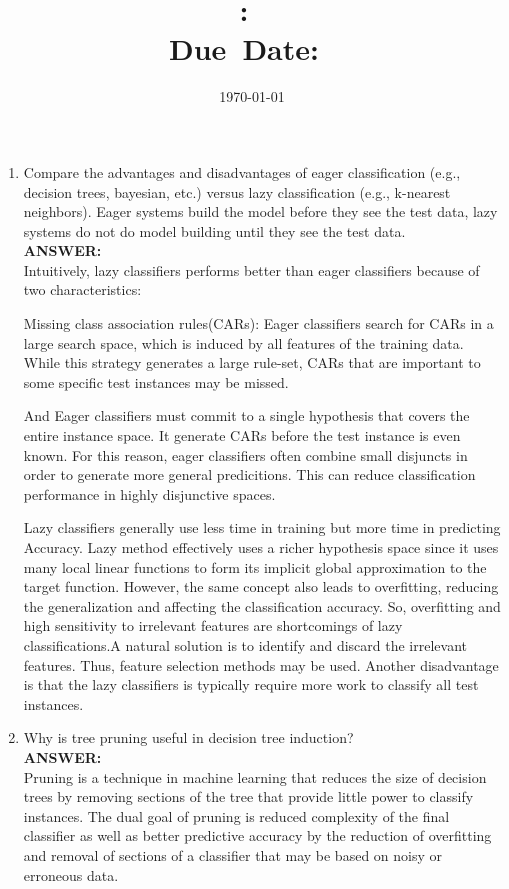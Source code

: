 \documentclass{article}
\title{\textbf{\hmwkClass:\ 
      \hmwkTitle}\\\normalsize\small{Due\ Date:\
    \hmwkDueDate}}
\date{\today}
\author{\textbf{\hmwkAuthorName}}
\begin{document}
\maketitle

\begin{enumerate}
\item Compare the advantages and disadvantages of eager classification
  (e.g., decision trees, bayesian, etc.) versus lazy classification
  (e.g., k-nearest neighbors). Eager systems build the model before
  they see the test data, lazy systems do not do model building until
  they see the test data. \\
\textbf{ANSWER:}\\ 
Intuitively, lazy classifiers performs better than eager classifiers
because of two characteristics: 

Missing class association rules(CARs): Eager classifiers search for
CARs in a large search space, which is induced by all features of the
training data. While this strategy generates a large rule-set, CARs
that are important to some specific test instances may be missed. 

And Eager classifiers must commit to a single hypothesis that covers
the entire instance space. It generate CARs before the test instance
is even known. For this reason, eager classifiers often combine small
disjuncts in order to generate more general predicitions. This can
reduce classification performance in highly disjunctive spaces. 

Lazy classifiers generally use less time in training but more time in
predicting Accuracy. Lazy method effectively uses a richer hypothesis
space since it uses many local linear functions to form its implicit
global approximation to the target function. 
However, the same concept also leads to overfitting, reducing the
generalization and affecting the classification accuracy. So,
overfitting and high sensitivity to irrelevant features are
shortcomings of lazy classifications.A natural solution is to identify
and discard the irrelevant features. Thus, feature selection methods
may be used. Another disadvantage is that the lazy classifiers is
typically require more work to classify all test instances. 

\item Why is tree pruning useful in decision tree induction? \\
\textbf{ANSWER:} \\
Pruning is a technique in machine learning that reduces the size of
decision trees by removing sections of the tree that provide little
power to classify instances. The dual goal of pruning is reduced
complexity of the final classifier as well as better predictive
accuracy by the reduction of overfitting and removal of sections of a
classifier that may be based on noisy or erroneous data.


\end{enumerate}
\end{document}
